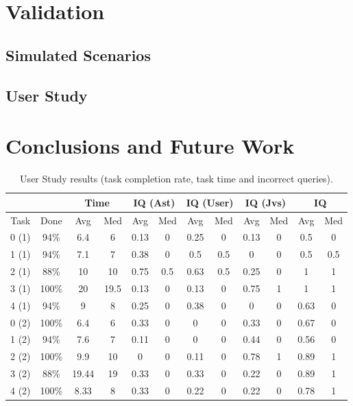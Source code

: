 \documentclass[runningheads]{llncs}
\begin{document}
\section{Validation}
\subsection{Simulated Scenarios}
\subsection{User Study}

\section{Conclusions and Future Work}

\begin{table}
    \caption{User Study results (task completion rate, task time and incorrect queries).}
    \centering
    \begin{tabular}{ | c | c | c | c | c | c | c | c | c | c | c | c |}
    \hline
    \multicolumn{2}{|c|}{} & \multicolumn{2}{|c|}{Time} & \multicolumn{2}{|c|}{IQ (Ast)} & \multicolumn{2}{|c|}{IQ (User)} & \multicolumn{2}{|c|}{IQ (Jvs)} & \multicolumn{2}{|c|}{IQ} \\ \hline
    Task & Done & Avg & Med & Avg & Med & Avg & Med & Avg & Med & Avg & Med \\ \hline
    
    0 (1) & 94\% & 6.4 & 6 & 0.13 & 0 & 0.25 & 0 & 0.13 & 0 & 0.5 & 0 \\ \hline
    1 (1) & 94\% & 7.1 & 7 & 0.38 & 0 & 0.5 & 0.5 & 0 & 0 & 0.5 & 0.5 \\ \hline
    2 (1) & 88\% & 10 & 10 & 0.75 & 0.5 & 0.63 & 0.5 & 0.25 & 0 & 1 & 1 \\ \hline
    3 (1) & 100\% & 20 & 19.5 & 0.13 & 0 & 0.13 & 0 & 0.75 & 1 & 1 & 1 \\ \hline
    4 (1) & 94\% & 9 & 8 & 0.25 & 0 & 0.38 & 0 & 0 & 0 & 0.63 & 0 \\ \hline
    0 (2) & 100\% & 6.4 & 6 & 0.33 & 0 & 0 & 0 & 0.33 & 0 & 0.67 & 0 \\ \hline
    1 (2) & 94\% & 7.6 & 7 & 0.11 & 0 & 0 & 0 & 0.44 & 0 & 0.56 & 0 \\ \hline
    2 (2) & 100\% & 9.9 & 10 & 0 & 0 & 0.11 & 0 & 0.78 & 1 & 0.89 & 1 \\ \hline
    3 (2) & 88\% & 19.44 & 19 & 0.33 & 0 & 0.33 & 0 & 0.22 & 0 & 0.89 & 1 \\ \hline
    4 (2) & 100\% & 8.33 & 8 & 0.33 & 0 & 0.22 & 0 & 0.22 & 0 & 0.78 & 1 \\ \hline
    \end{tabular}

    \label{table:studyresults}
\end{table}
\end{document}
